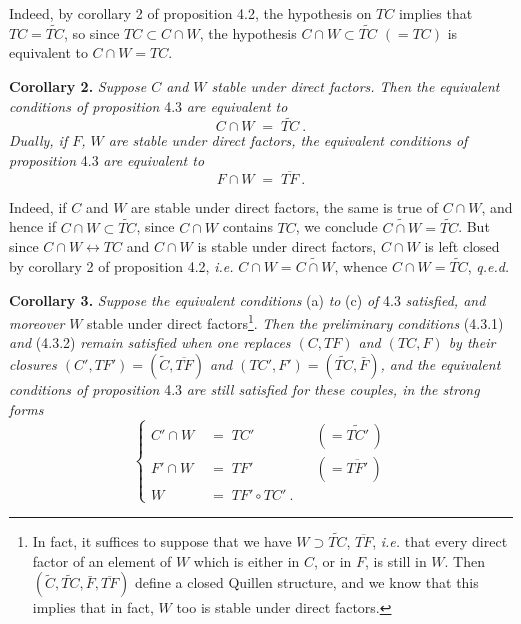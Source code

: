\documentclass[11pt]{article}
\newcommand{\printedpage}[1]{\marginpar{\footnotesize p.~#1}}
\newcommand{\msp}[1]{\marginpar{\footnotesize [#1]}}
\begin{document}
\printedpage{24}

\msp{page 35}
Indeed, by corollary 2 of proposition 4.2, the hypothesis on $TC$ implies that $TC = \widetilde{TC}$, so since $TC \subset C{\cap}W$, the hypothesis $C{\cap}W \subset \widetilde{TC}$ $(= TC)$ is equivalent to $C{\cap}W = TC$.

\textbf{Corollary 2.} \textit{Suppose $C$ and $W$ stable under direct factors. Then the equivalent conditions of proposition} 4.3 \textit{are equivalent to}
\[
C\cap W \;=\; \widetilde{TC}\ . \tag*{(4.3.5)}
\]
\textit{Dually, if $F$, $W$ are stable under direct factors, the equivalent conditions of proposition} 4.3 \textit{are equivalent to}
\[
F\cap W \;=\; \overline{TF}\ . \tag*{(4.3.5$'$)}
\]

Indeed, if $C$ and $W$ are stable under direct factors, the same is true of $C\cap W$, and hence if $C\cap W\subset\widetilde{TC}$, since $C\cap W$ contains $TC$, we conclude $\widetilde{C\cap W}=\widetilde{TC}$. But since $C\cap W\longleftrightarrow TC$ and $C\cap W$ is stable under direct factors, $C\cap W$ is left closed by corollary 2 of proposition 4.2, \textit{i.e.} $C\cap W=\widetilde{C\cap W}$, whence $C\cap W=\widetilde{TC}$, \quad \textit{q.e.d.}

\textbf{Corollary 3.} \textit{Suppose the equivalent conditions} (a) \textit{to} (c) \textit{of} 4.3 \textit{satisfied, and moreover} $W$ stable under direct factors\footnote[12]{In fact, it suffices to suppose that we have $W\supset\widetilde{TC}$, $\overline{TF}$, \textit{i.e.} that every direct factor of an element of $W$ which is either in $C$, or in $F$, is still in $W$. Then $(\widetilde{C},\widetilde{TC},\bar{F},\overline{TF})$ define a closed Quillen structure, and we know that this implies that in fact, $W$ too is stable under direct factors.}. \textit{Then the preliminary conditions} (4.3.1) \textit{and} (4.3.2) \textit{remain satisfied when one replaces $(C,TF)$ and $(TC,F)$ by their closures $(C',TF')=(\widetilde{C},\overline{TF})$ and $(TC',F')=(\widetilde{TC},\bar{F})$, and the equivalent conditions of proposition} 4.3 \textit{are still satisfied for these couples, in the strong forms}
\[
\left\{
\begin{aligned}
C'\cap W &\;=\; TC' && (=\widetilde{TC'}\,)\\
F'\cap W &\;=\; TF' && (=\overline{TF'}\,)\\
W &\;=\; TF'\circ TC'\ .
\end{aligned}
\right.
\tag*{(4.3.6)}
\]
\end{document}
